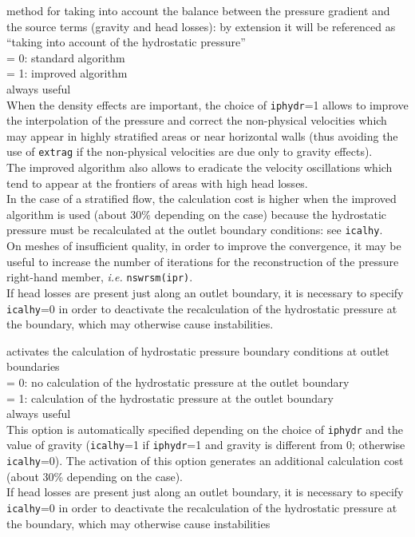 {method for taking into account the balance between the pressure gradient and
the source terms (gravity and head losses): by extension it will be
referenced as ``taking into account of the hydrostatic pressure''\\
\hspace*{1.3cm}= 0: standard algorithm\\
\hspace*{1.3cm}= 1: improved algorithm\\
always useful\\
When the density effects are important, the choice of
{\tt iphydr}=1 allows to improve the interpolation of the pressure and correct the
non-physical velocities which may appear in highly
stratified areas or near horizontal walls (thus
avoiding the use of {\tt extrag} if the non-physical velocities are due only to
gravity effects).\\
The improved algorithm also allows to eradicate the velocity oscillations
which tend to appear at the frontiers of areas with high head losses.\\
In the case of a stratified flow, the calculation cost is higher when the
improved algorithm is used (about 30\% depending on the case) because
the hydrostatic pressure must be recalculated at the outlet boundary
conditions: see {\tt icalhy}.\\
On meshes of insufficient quality, in order to
improve the convergence, it may be useful to increase the number of
iterations for the reconstruction of the pressure right-hand member,
{\em i.e.} \mbox{\tt nswrsm(ipr)}.\\
If head losses are present just along an outlet boundary, it is necessary to
specify {\tt icalhy}=0 in order to deactivate the recalculation of the hydrostatic
pressure at the boundary, which may otherwise cause instabilities.}

{activates the calculation of hydrostatic pressure boundary conditions at outlet
boundaries\\
\hspace*{1.3cm}= 0: no calculation of the hydrostatic pressure at the outlet boundary\\
\hspace*{1.3cm}= 1: calculation of the hydrostatic pressure at the outlet boundary\\
always useful\\
This option is automatically specified depending on the
choice of {\tt iphydr} and the value of gravity
({\tt icalhy}=1 if {\tt iphydr}=1 and gravity is different from 0; otherwise
{\tt icalhy}=0). The activation of this option generates an additional
calculation cost (about 30\% depending on the case).\\
If head losses are present just along an outlet boundary, it is necessary to
specify {\tt icalhy}=0 in order to deactivate the recalculation of the hydrostatic
pressure at the boundary, which may otherwise cause instabilities}

